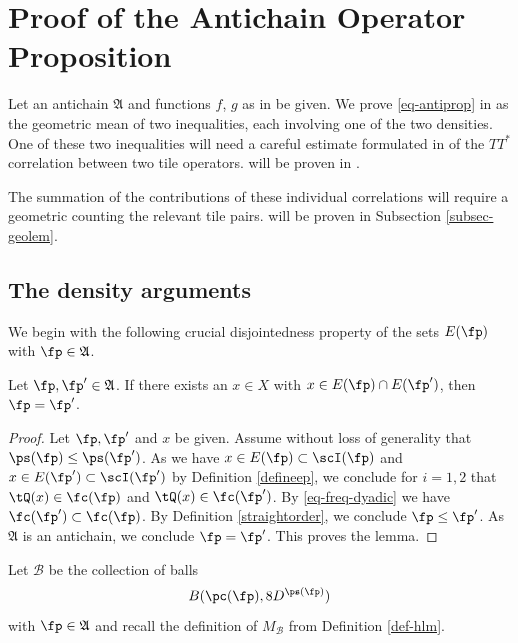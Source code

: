 \section{Proof of the Antichain Operator Proposition}

\label{antichainboundary}

Let an antichain $\mathfrak{A}$
and functions $f$, $g$ as in  be given.
We prove \eqref{eq-antiprop}
in 
as the geometric mean of two inequalities,
each involving one of the two densities.
One of these two inequalities will need a careful estimate formulated in
 of
the $TT^*$ correlation between two tile operators.
 will be proven in
.

The summation of the contributions of these individual correlations will require a
geometric  counting the relevant tile pairs.
 will be proven in Subsection
\ref{subsec-geolem}.






\subsection{The density arguments}\label{sec-TT*-T*T}

We begin with the following crucial disjointedness property of the sets $E(\fp)$ with $\fp \in \mathfrak{A}$.
\begin{lemma}
\label{tile-disjointness}
\leanok
{}
Let $\fp,\fp'\in \mathfrak{A}$.
If there exists an $x\in X$ with $x\in E(\fp)\cap E(\fp')$,
then $\fp= \fp'$.
\end{lemma}
\begin{proof}
\leanok
Let $\fp,\fp'$ and $x$ be given.
Assume without loss of generality that $\ps(\fp)\le \ps(\fp')$.
As we have $x\in E(\fp)\subset \scI(\fp)$ and $x\in E(\fp')\subset \scI(\fp')$ by Definition \eqref{defineep}, we conclude
for $i=1,2$ that
$\tQ(x)\in\fc(\fp)$ and $\tQ(x)\in\fc(\fp')$. By \eqref{eq-freq-dyadic} we have $\fc(\fp')\subset \fc(\fp)$. By Definition
\eqref{straightorder}, we conclude $\fp\le \fp'$. As $\mathfrak{A}$ is an antichain, we conclude $\fp=\fp'$.
This proves the lemma.
\end{proof}



Let $\mathcal{B}$ be the collection of balls
\begin{equation}
    B(\pc(\fp), 8D^{\ps(\fp)})
\end{equation}
with $\fp\in \mathfrak{A}$ and recall the definition of
$M_{\mathcal{B}}$ from Definition \ref{def-hlm}.

